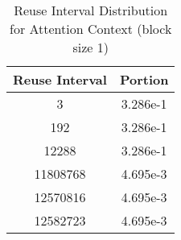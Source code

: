 \documentclass[conference]{article}
\begin{document}
\begin{table}[H]
\centering
\begin{tabular}{|c|c|}
    \hline
    Reuse Interval & Portion \\ 
    \hline
    3 & 3.286e-1 \\ 
    192 & 3.286e-1 \\ 
    12288 & 3.286e-1 \\ 
    11808768 & 4.695e-3 \\ 
    12570816 & 4.695e-3 \\ 
    12582723 & 4.695e-3 \\ 
    \hline
\end{tabular}
\caption{Reuse Interval Distribution for Attention Context (block size 1)}
\end{table}
\end{document}
